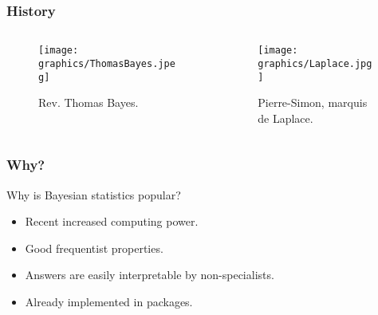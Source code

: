 \documentclass{beamer}
\newcommand{\1}{\ensuremath{\mathbf{1}}}
\begin{document}
%
%
%
\begin{frame}\frametitle{History}
	\begin{columns}
	\begin{column}{.5\textwidth}
		\begin{figure}
		\begin{center}
			\texttt{[image: graphics/ThomasBayes.jpeg]}
		\end{center}
		\caption{Rev. Thomas Bayes.}
		\end{figure}
	\end{column}	
	\begin{column}{.5\textwidth}
		\begin{figure}
		\begin{center}
			\texttt{[image: graphics/Laplace.jpg]}
		\end{center}
		\caption{Pierre-Simon, marquis de Laplace.}
		\end{figure}
	\end{column}	
	\end{columns}
\end{frame}
%
%
%
\begin{frame}\frametitle{Why?}
	\begin{block}{Why is Bayesian statistics popular?}
		\begin{itemize}
			\item Recent increased computing power.
			\item Good frequentist properties.
			\item Answers are easily interpretable by non-specialists.
			\item Already implemented in packages.
		\end{itemize}
	\end{block}
\end{frame}
%
%
%
\end{document}
